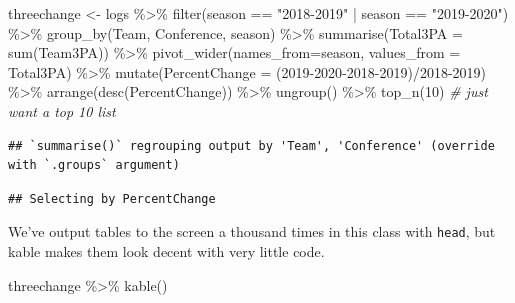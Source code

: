 \documentclass[
]{book}
\newenvironment{Shaded}{\begin{snugshade}}{\end{snugshade}}
\newcommand{\AttributeTok}[1]{\textcolor[rgb]{0.77,0.63,0.00}{#1}}
\newcommand{\CommentTok}[1]{\textcolor[rgb]{0.56,0.35,0.01}{\textit{#1}}}
\newcommand{\DecValTok}[1]{\textcolor[rgb]{0.00,0.00,0.81}{#1}}
\newcommand{\FunctionTok}[1]{\textcolor[rgb]{0.00,0.00,0.00}{#1}}
\newcommand{\NormalTok}[1]{#1}
\newcommand{\OtherTok}[1]{\textcolor[rgb]{0.56,0.35,0.01}{#1}}
\newcommand{\SpecialCharTok}[1]{\textcolor[rgb]{0.00,0.00,0.00}{#1}}
\newcommand{\StringTok}[1]{\textcolor[rgb]{0.31,0.60,0.02}{#1}}
\begin{document}
\begin{Shaded}
\begin{Highlighting}[]
\NormalTok{threechange }\OtherTok{\textless{}{-}}\NormalTok{ logs }\SpecialCharTok{\%\textgreater{}\%}
  \FunctionTok{filter}\NormalTok{(season }\SpecialCharTok{==} \StringTok{"2018{-}2019"} \SpecialCharTok{|}\NormalTok{ season }\SpecialCharTok{==} \StringTok{"2019{-}2020"}\NormalTok{) }\SpecialCharTok{\%\textgreater{}\%}
  \FunctionTok{group\_by}\NormalTok{(Team, Conference, season) }\SpecialCharTok{\%\textgreater{}\%}
  \FunctionTok{summarise}\NormalTok{(}\AttributeTok{Total3PA =} \FunctionTok{sum}\NormalTok{(Team3PA)) }\SpecialCharTok{\%\textgreater{}\%}
  \FunctionTok{pivot\_wider}\NormalTok{(}\AttributeTok{names\_from=}\NormalTok{season, }\AttributeTok{values\_from =}\NormalTok{ Total3PA) }\SpecialCharTok{\%\textgreater{}\%}
  \FunctionTok{mutate}\NormalTok{(}\AttributeTok{PercentChange =}\NormalTok{ (}\StringTok{\textasciigrave{}}\AttributeTok{2019{-}2020}\StringTok{\textasciigrave{}}\SpecialCharTok{{-}}\StringTok{\textasciigrave{}}\AttributeTok{2018{-}2019}\StringTok{\textasciigrave{}}\NormalTok{)}\SpecialCharTok{/}\StringTok{\textasciigrave{}}\AttributeTok{2018{-}2019}\StringTok{\textasciigrave{}}\NormalTok{) }\SpecialCharTok{\%\textgreater{}\%}
  \FunctionTok{arrange}\NormalTok{(}\FunctionTok{desc}\NormalTok{(PercentChange)) }\SpecialCharTok{\%\textgreater{}\%} 
  \FunctionTok{ungroup}\NormalTok{() }\SpecialCharTok{\%\textgreater{}\%}
  \FunctionTok{top\_n}\NormalTok{(}\DecValTok{10}\NormalTok{) }\CommentTok{\# just want a top 10 list}
\end{Highlighting}
\end{Shaded}

\begin{verbatim}
## `summarise()` regrouping output by 'Team', 'Conference' (override with `.groups` argument)
\end{verbatim}

\begin{verbatim}
## Selecting by PercentChange
\end{verbatim}

We've output tables to the screen a thousand times in this class with \texttt{head}, but kable makes them look decent with very little code.

\begin{Shaded}
\begin{Highlighting}[]
\NormalTok{threechange }\SpecialCharTok{\%\textgreater{}\%} \FunctionTok{kable}\NormalTok{()}
\end{Highlighting}
\end{Shaded}
\end{document}
